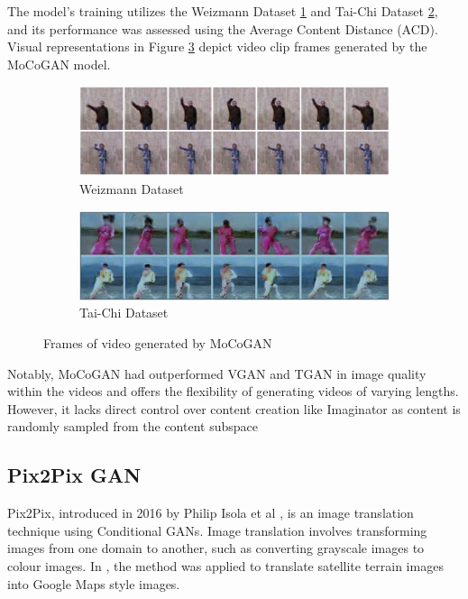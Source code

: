 \documentclass[12pt,twoside,a4paper,parskip]{scrbook} %
\begin{document}
The model's training utilizes the Weizmann Dataset \cite{15_act_rec} \ref{fig:moco1} and Tai-Chi Dataset \cite{17_taichi} \ref{fig:Moco2}, and its performance was assessed using the Average Content Distance (ACD). Visual representations in Figure \ref{fig:moco} depict video clip frames generated by the MoCoGAN model.
\begin{figure}[htb]
    \centering
    \begin{subfigure}{0.6\textwidth}
        \centering
        \includegraphics[width=\linewidth]{Images/Moco1.png}
        \caption{Weizmann Dataset}
        \label{fig:moco1}
    \end{subfigure}
    \hfill
    \begin{subfigure}{0.6\textwidth}
        \centering
        \includegraphics[width=\linewidth]{Images/Moco2.png}
        \caption{Tai-Chi Dataset}
        \label{fig:Moco2}
    \end{subfigure}
    \caption{Frames of video generated by MoCoGAN}
    \label{fig:moco}
\end{figure}
Notably, MoCoGAN had outperformed VGAN \cite{8_Vgan}and TGAN \cite{tgan} in image quality within the videos and offers the flexibility of generating videos of varying lengths. However, it lacks direct control over content creation like Imaginator as content is randomly sampled from the content subspace
\subsection{Pix2Pix GAN}
Pix2Pix, introduced in 2016 by Philip Isola et al \cite{11_image2_image}, is an image translation technique using Conditional GANs. Image translation involves transforming images from one domain to another, such as converting grayscale images to colour images. In \cite{12_pix2pix}, the method was applied to translate satellite terrain images into Google Maps style images. 
\end{document}
